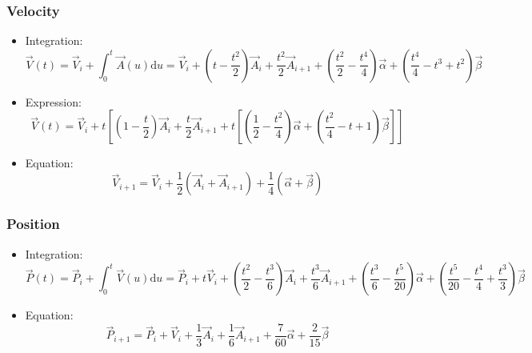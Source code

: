\documentclass[aps,12pt]{revtex4}
\begin{document}
\subsubsection{Velocity}
\begin{itemize}
\item Integration:
\begin{equation}
	\vec{V}(t) = \vec{V}_i + \int_0^t \vec{A}(u)\mathrm{d}u = \vec{V}_i + \left(t-\dfrac{t^2}{2}\right) \vec{A}_i + \dfrac{t^2}{2} \vec{A}_{i+1} + \left(\dfrac{t^2}{2} - \dfrac{t^4}{4} \right) \vec{\alpha} + \left(\dfrac{t^4}{4} - t^3 + t^2\right) \vec{\beta}
\end{equation}

\item Expression:
\begin{equation}
 \vec{V}(t) = \vec{V}_i + t 
 \left[ \left(1-\dfrac{t}{2}\right) \vec{A}_i + \dfrac{t}{2} \vec{A}_{i+1} +
  t \left [
  \left(\dfrac{1}{2} - \dfrac{t^2}{4} \right) \vec{\alpha} + \left(\dfrac{t^2}{4} - t + 1\right) \vec{\beta}
  \right ]
 \right]
\end{equation}

\item Equation:
\begin{equation}
\vec{V}_{i+1} = \vec{V}_i + \dfrac{1}{2}\left(\vec{A}_i + \vec{A}_{i+1}\right) + \dfrac{1}{4} \left( \vec{\alpha} + \vec{\beta}\right)
\end{equation}

\end{itemize}

\subsubsection{Position}
\begin{itemize}
\item Integration:
\begin{equation}
	\vec{P}(t) = \vec{P}_{i} + \int_0^t \vec{V}(u)\mathrm{d}u = \vec{P}_i + t \vec{V}_i 
	+ \left(\dfrac{t^2}{2} - \dfrac{t^3}{6}\right) \vec{A}_i + \dfrac{t^3}{6} \vec{A}_{i+1} 
	+ \left(\dfrac{t^3}{6} - \dfrac{t^5}{20} \right) \vec{\alpha}
	+ \left( \dfrac{t^5}{20} - \dfrac{t^4}{4} + \dfrac{t^3}{3} \right) \vec{\beta}
\end{equation}

\item Equation:
\begin{equation}
	\vec{P}_{i+1} = \vec{P}_i + \vec{V}_{i} + \dfrac{1}{3} \vec{A}_i + \dfrac{1}{6} \vec{A}_{i+1} + \dfrac{7}{60} \vec{\alpha} + \dfrac{2}{15} \vec{\beta}
\end{equation}

\end{itemize}
\end{document}
